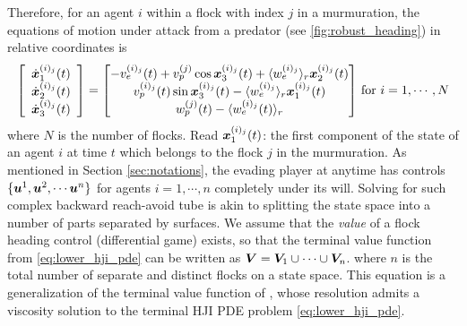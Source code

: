 Therefore, for an agent $i$ within a flock with index $j$ in a murmuration, the equations of motion under attack from a predator (see \autoref{fig:robust_heading}) in relative coordinates is %
%
\begin{align}
\left[\begin{array}{c}
\dot{\state}_1^{(i)_j}(t) \\ \dot{\state}_2^{(i)_j} (t) \\ \dot{\state}_3^{(i)_j} (t)
\end{array}\right] = \begin{bmatrix}
-v_e^{(i)_j}(t) + v_p^{(j)} \cos \state_3^{(i)_j}(t) + \langle w_e^{(i)_j} \rangle_r \state_2^{(i)_j}(t)
%
\\
v_p^{(i)_j}(t)\sin \state_3^{(i)_j}(t) - \langle w_e^{(i)_j} \rangle_r \state_1^{(i)_j}(t)
\\ 
w_p^{(j)}(t) - \langle w_e^{(i)_j}(t) \rangle_r
\end{bmatrix} \, \text{for } i=1,\cdots, N
\end{align}
%
where $N$ is the number of flocks. Read ${\bm{x}}_1^{(i)_j}(t)$: the first component of the state of an agent $i$ at time $t$ which belongs to the flock $j$ in the murmuration. As mentioned in Section \ref{sec:notations}, the evading player at anytime has controls $\{\bm{u}^1, \bm{u}^2, \cdots \bm{u}^n\}$ for agents $i=1, \cdots, n$ completely  under its will. Solving for such complex backward reach-avoid tube is akin to splitting the state space into a number of parts separated by surfaces. 
We assume that the \textit{value} of a flock heading control (differential game) exists, so that the terminal value function from \eqref{eq:lower_hji_pde} can be written as $\bm{V} = \bm{V}_1 \cup \cdots \cup \bm{V}_n$.%
%
%
where $n$ is the total number of separate and distinct flocks on a state space. This equation is a generalization of the terminal value function of \cite{Mitchell2005}, whose resolution admits a viscosity solution to the terminal HJI PDE problem \eqref{eq:lower_hji_pde}.

